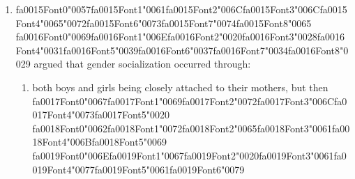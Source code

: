 \documentclass[12pt]{article}
\begin{document}
\begin{enumerate}[label=\arabic*.]
\begin{enumerate}[label=(\alph*)]
    \item {\char"0041}{\csname fa0010Font1\endcsname\char"0020}{\csname fa0010Font2\endcsname\char"0073}{\csname fa0010Font3\endcsname\char"0065}{\csname fa0010Font4\endcsname\char"0063}{\csname fa0010Font5\endcsname\char"006F}{\csname fa0010Font6\endcsname\char"006E}{\csname fa0010Font7\endcsname\char"0064} {\char"0061}{\csname fa0011Font1\endcsname\char"0072}{\csname fa0011Font2\endcsname\char"0079}{\csname fa0011Font3\endcsname\char"0020}{\csname fa0011Font4\endcsname\char"0067}{\csname fa0011Font5\endcsname\char"0072}{\csname fa0011Font6\endcsname\char"006F}{\csname fa0011Font7\endcsname\char"0075}{\csname fa0011Font8\endcsname\char"0070}
    \item {\char"0041}{\csname fa0012Font1\endcsname\char"0020}{\csname fa0012Font2\endcsname\char"0070}{\csname fa0012Font3\endcsname\char"0072}{\csname fa0012Font4\endcsname\char"0069} {\csname fa0013Font0\endcsname\char"006D}{\csname fa0013Font1\endcsname\char"0061}{\csname fa0013Font2\endcsname\char"0072}{\csname fa0013Font3\endcsname\char"0079}{\csname fa0013Font4\endcsname\char"0020} {\csname fa0014Font0\endcsname\char"0067}{\csname fa0014Font1\endcsname\char"0072}{\csname fa0014Font2\endcsname\char"006F}{\csname fa0014Font3\endcsname\char"0075}{\csname fa0014Font4\endcsname\char"0070}
\end{enumerate}
\item {\csname fa0015Font0\endcsname\char"0057}{\csname fa0015Font1\endcsname\char"0061}{\csname fa0015Font2\endcsname\char"006C}{\csname fa0015Font3\endcsname\char"006C}{\csname fa0015Font4\endcsname\char"0065}{\char"0072}{\csname fa0015Font6\endcsname\char"0073}{\csname fa0015Font7\endcsname\char"0074}{\csname fa0015Font8\endcsname\char"0065} {\csname fa0016Font0\endcsname\char"0069}{\csname fa0016Font1\endcsname\char"006E}{\csname fa0016Font2\endcsname\char"0020}{\csname fa0016Font3\endcsname\char"0028}{\csname fa0016Font4\endcsname\char"0031}{\csname fa0016Font5\endcsname\char"0039}{\csname fa0016Font6\endcsname\char"0037}{\csname fa0016Font7\endcsname\char"0034}{\csname fa0016Font8\endcsname\char"0029} argued that gender socialization occurred through:
\begin{enumerate}[label=(\alph*)]
    \item both boys and girls being closely attached to their mothers, but then {\csname fa0017Font0\endcsname\char"0067}{\csname fa0017Font1\endcsname\char"0069}{\csname fa0017Font2\endcsname\char"0072}{\csname fa0017Font3\endcsname\char"006C}{\csname fa0017Font4\endcsname\char"0073}{\csname fa0017Font5\endcsname\char"0020} {\csname fa0018Font0\endcsname\char"0062}{\csname fa0018Font1\endcsname\char"0072}{\csname fa0018Font2\endcsname\char"0065}{\csname fa0018Font3\endcsname\char"0061}{\csname fa0018Font4\endcsname\char"006B}{\csname fa0018Font5\endcsname\char"0069} {\csname fa0019Font0\endcsname\char"006E}{\csname fa0019Font1\endcsname\char"0067}{\csname fa0019Font2\endcsname\char"0020}{\csname fa0019Font3\endcsname\char"0061}{\csname fa0019Font4\endcsname\char"0077}{\csname fa0019Font5\endcsname\char"0061}{\csname fa0019Font6\endcsname\char"0079}

\end{enumerate}
\end{enumerate}
\end{document}
